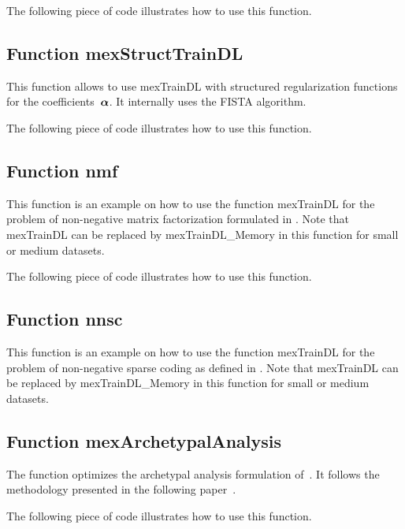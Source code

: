 \documentclass[a4paper, 11pt]{article}
\begin{document}

The following piece of code illustrates how to use this function.


\subsection{Function mexStructTrainDL}
This function allows to use mexTrainDL with structured regularization functions
for the coefficients~${\boldsymbol\alpha}$. It internally uses the FISTA algorithm.

The following piece of code illustrates how to use this function.


\subsection{Function nmf}
This function is an example on how to use the function mexTrainDL for the
problem of non-negative matrix factorization formulated in \cite{lee2}.  Note
that mexTrainDL can be replaced by mexTrainDL\_Memory in this function for
small or medium datasets.


The following piece of code illustrates how to use this function.


\subsection{Function nnsc}
This function is an example on how to use the function mexTrainDL for the
problem of non-negative sparse coding as defined in \cite{hoyer}.  Note that
mexTrainDL can be replaced by mexTrainDL\_Memory in this function for small or
medium datasets.



\subsection{Function mexArchetypalAnalysis}
The function optimizes the archetypal analysis formulation of~\cite{Cut94}. It follows the
methodology presented in the following paper~\cite{ChenCVPR}.


The following piece of code illustrates how to use this function.

\end{document}
